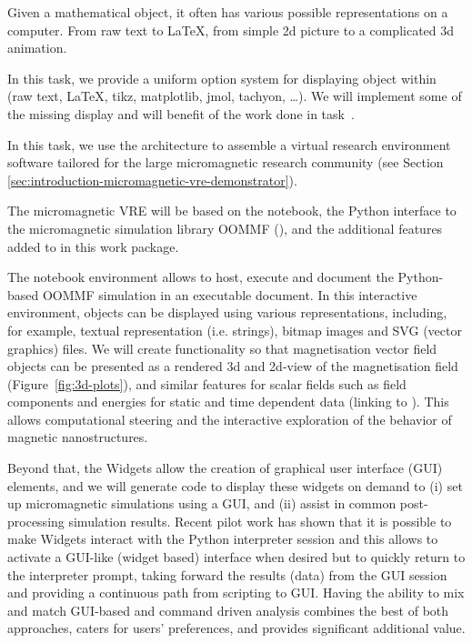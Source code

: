 \begin{workpackage}
\begin{tasklist}
\begin{task}[lead=UB,title=Common option system for various displays
  in Sage,id=Sage-display,PM=12,wphases=0-24]
  Given a mathematical object, it often has various possible
  representations on a computer. From raw text to \LaTeX, from simple
  2d picture to a complicated 3d animation.

  In this task, we provide a uniform option system for displaying
  object within \Sage (raw text, \LaTeX, tikz, matplotlib, jmol,
  tachyon, \ldots). We will implement some of the missing display and
  will benefit of the work done in task~.
\end{task}

\begin{task}[lead=USO,title=Case study: micromagnetic VRE built from
  \TheProject,id=oommf-py-ipython-attributes,PM=6,partners={SR,USH},wphases=9-15]

  In this task, we use the \TheProject architecture to assemble a
  virtual research environment software tailored for the large
  micromagnetic research community
  (see Section \ref{sec:introduction-micromagnetic-vre-demonstrator}).

  The micromagnetic VRE will be based on the \Jupyter notebook, the
  Python interface to the micromagnetic simulation library OOMMF
  (),
  and the additional features added to \Jupyter in this work
  package.

  The \Jupyter notebook environment allows to host, execute and
  document the Python-based OOMMF simulation in an executable
  document. In this interactive environment, objects can be displayed
  using various representations, including, for example, textual
  representation (i.e. strings), bitmap images and SVG (vector
  graphics) files. We will create functionality so that magnetisation
  vector field objects can be presented as a rendered 3d and 2d-view
  of the magnetisation field (Figure~\ref{fig:3d-plots}), and similar
  features for scalar fields such as field components and energies for
  static and time dependent data (linking to
  ). This allows computational steering and the
  interactive exploration of the behavior of magnetic nanostructures.

  Beyond that, the \Jupyter Widgets allow the creation of graphical
  user interface (GUI) elements, and we will generate code to display
  these widgets on demand to (i) set up micromagnetic simulations
  using a GUI, and (ii) assist in common post-processing simulation
  results. Recent pilot work has shown that it is possible to make
  \Jupyter Widgets interact with the Python interpreter session and
  this allows to activate a GUI-like (widget based) interface when
  desired but to quickly return to the interpreter prompt, taking
  forward the results (data) from the GUI session
  \cite{IPython-widget-GUI-demo-youtube-2014} and providing a
  continuous path from scripting to GUI. Having the ability to mix and
  match GUI-based and command driven analysis combines the best of
  both approaches, caters for users' preferences, and provides
  significant additional value.


\end{task}
\end{tasklist}
\end{workpackage}
